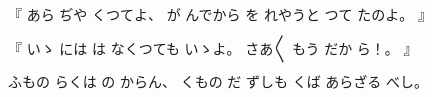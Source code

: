 %
『
あら
ぢや
くつてよ、
%
が
んでから
を
れやうと%
つて
たのよ。
』

%
『
いゝ{}%
には
は
なくつても
いゝよ。%
%
さあ〳〵
もう
だか
ら！。
』

%
ふもの
らくは
の
からん、
%
くもの
だ
ずしも
くば
あらざる
べし。
